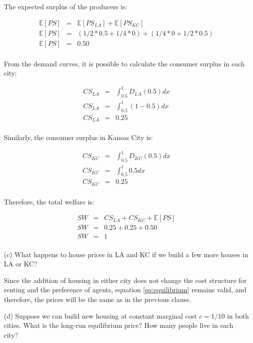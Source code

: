 The expected surplus of the producers is: 


\begin{eqnarray*}
    \mathbb{E}[PS] &=& \mathbb{E}[PS_{LA}] + \mathbb{E}[PS_{KC}]\\
    \mathbb{E}[PS] &=& (1/2*0.5 + 1/4*0) + (1/4 * 0 + 1/2*0.5)\\
    \mathbb{E}[PS] &=& 0.50\\
\end{eqnarray*}

From the demand curves, it is possible to calculate the consumer surplus in each city:

\begin{eqnarray*}
    CS_{LA} &=& \int_{0.5}^{1}  D_{LA}(0.5) dx\\
    CS_{LA} &=& \int_{0.5}^{1}  (1 - 0.5)dx\\
    CS_{LA} &=& 0.25\\
\end{eqnarray*}

Similarly, the consumer surplus in Kansas City is:

\begin{eqnarray*}
    CS_{KC} &=& \int_{0.5}^{1}  D_{KC}(0.5) dx\\
    CS_{KC} &=& \int_{0.5}^{1}  0.5dx\\
    CS_{KC} &=& 0.25\\
\end{eqnarray*}



Therefore, the total welfare is:

\begin{eqnarray*}
    SW &=& CS_{LA} + CS_{KC} + \mathbb{E}[PS]\\
    SW &=& 0.25 + 0.25 + 0.50\\
    SW &=& 1\\
\end{eqnarray*}

\begin{tcolorbox}
    (c) What happens to house prices in LA and KC if we build a few more houses in LA or KC?
\end{tcolorbox}

\begin{myanswerbox}
    Since the addition of housing in either city does not change the cost structure for renting and the preference of agents, equation \ref{eq:equilibrium} remains valid, and therefore, the prices will be the same as in the previous clause.
\end{myanswerbox}
\begin{tcolorbox}
    (d) Suppose we can build new housing at constant marginal cost \( c = 1/10 \) in both cities. What is the long-run equilibrium price? How many people live in each city?
\end{tcolorbox}

